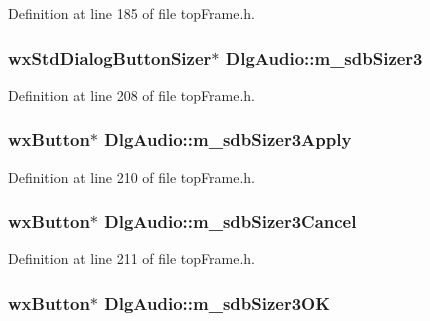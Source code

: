 Definition at line 185 of file top\-Frame.\-h.

\hypertarget{class_dlg_audio_aa2834821c2fcae88fbedf3abfb9d69e0}{
\subsubsection[{m\-\_\-sdb\-Sizer3}]{\setlength{\rightskip}{0pt plus 5cm}wx\-Std\-Dialog\-Button\-Sizer$\ast$ Dlg\-Audio\-::m\-\_\-sdb\-Sizer3\hspace{0.3cm}{\ttfamily [protected]}}}\label{class_dlg_audio_aa2834821c2fcae88fbedf3abfb9d69e0}


Definition at line 208 of file top\-Frame.\-h.

\hypertarget{class_dlg_audio_a2a6d0fffd35e01a0b59c22164625e6c3}{
\subsubsection[{m\-\_\-sdb\-Sizer3\-Apply}]{\setlength{\rightskip}{0pt plus 5cm}wx\-Button$\ast$ Dlg\-Audio\-::m\-\_\-sdb\-Sizer3\-Apply\hspace{0.3cm}{\ttfamily [protected]}}}\label{class_dlg_audio_a2a6d0fffd35e01a0b59c22164625e6c3}


Definition at line 210 of file top\-Frame.\-h.

\hypertarget{class_dlg_audio_a749b04f8606ba939394d75267f8003ce}{
\subsubsection[{m\-\_\-sdb\-Sizer3\-Cancel}]{\setlength{\rightskip}{0pt plus 5cm}wx\-Button$\ast$ Dlg\-Audio\-::m\-\_\-sdb\-Sizer3\-Cancel\hspace{0.3cm}{\ttfamily [protected]}}}\label{class_dlg_audio_a749b04f8606ba939394d75267f8003ce}


Definition at line 211 of file top\-Frame.\-h.

\hypertarget{class_dlg_audio_a81c75edcacae099633853ee775d72de9}{
\subsubsection[{m\-\_\-sdb\-Sizer3\-O\-K}]{\setlength{\rightskip}{0pt plus 5cm}wx\-Button$\ast$ Dlg\-Audio\-::m\-\_\-sdb\-Sizer3\-O\-K\hspace{0.3cm}{\ttfamily [protected]}}}\label{class_dlg_audio_a81c75edcacae099633853ee775d72de9}


